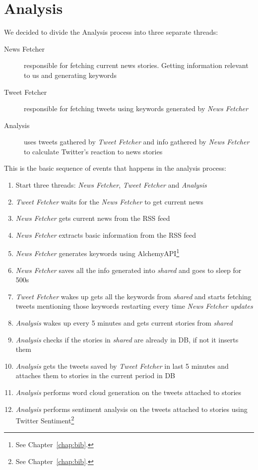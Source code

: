 \documentclass{report}
\begin{document}
	\section{Analysis}
	We decided to divide the Analysis process into three separate threads:
	\begin{description}
	 \item[News Fetcher] responsible for fetching current news stories. Getting information relevant to us and generating keywords
	 \item[Tweet Fetcher] responsible for fetching tweets using keywords generated by \emph{News Fetcher}
	 \item[Analysis] uses tweets gathered by \emph{Tweet Fetcher} and info gathered by \emph{News Fetcher} to calculate Twitter's reaction to news stories
	\end{description}
	
	This is the basic sequence of events that happens in the analysis process:
		\begin{enumerate}
		  \item Start three threads: \emph{News Fetcher}, \emph{Tweet Fetcher} and \emph{Analysis}
		  \item \emph{Tweet Fetcher} waits for the \emph{News Fetcher} to get current news
		  \item \emph{News Fetcher} gets current news from the RSS feed
		  \item \emph{News Fetcher} extracts basic information from the RSS feed
		  \item \emph{News Fetcher} generates keywords using AlchemyAPI\footnote{See Chapter~\ref{chap:bib}.}
		  \item \emph{News Fetcher} saves all the info generated into \emph{shared} and goes to sleep for 500s
		  \item \emph{Tweet Fetcher} wakes up gets all the keywords from \emph{shared} and starts fetching tweets mentioning those keywords restarting every time \emph{News Fetcher updates}
		  \item \emph{Analysis} wakes up every 5 minutes and gets current stories from \emph{shared}
		  \item \emph{Analysis} checks if the stories in \emph{shared} are already in DB, if not it inserts them
		  \item \emph{Analysis} gets the tweets saved by \emph{Tweet Fetcher} in last 5 minutes and attaches them to stories in the current period in DB
		  \item \emph{Analysis} performs word cloud generation on the tweets attached to stories
		  \item \emph{Analysis} performs sentiment analysis on the tweets attached to stories using Twitter Sentiment\footnote{See Chapter~\ref{chap:bib}.}
		\end{enumerate}
		
\end{document}
